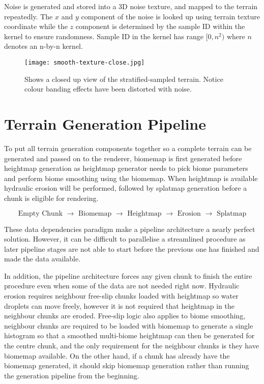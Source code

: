 \documentclass[oneside, a4paper]{report}
\begin{document}
    Noise is generated and stored into a 3D noise texture, and mapped to the terrain repeatedly. The $x$ and $y$ component of the noise is looked up using terrain texture coordinate while the $z$ component is determined by the sample ID within the kernel to ensure randomness. Sample ID in the kernel has range \([0, n^{2})\) where $n$ denotes an n-by-n kernel.

    \begin{figure}[H]
        \center
        \texttt{[image: smooth-texture-close.jpg]}
        \caption{Shows a closed up view of the stratified-sampled terrain. Notice colour banding effects have been distorted with noise.}
    \end{figure}

    \section{Terrain Generation Pipeline}

    To put all terrain generation components together so a complete terrain can be generated and passed on to the renderer, biomemap is first generated before heightmap generation as heightmap generator needs to pick biome parameters and perform biome smoothing using the biomemap. When heightmap is available hydraulic erosion will be performed, followed by splatmap generation before a chunk is eligible for rendering.

    \begin{equation*}
        \text{Empty Chunk } \rightarrow \text{ Biomemap } \rightarrow \text{ Heightmap } \rightarrow \text{ Erosion } \rightarrow \text{ Splatmap}
    \end{equation*}

    These data dependencies paradigm make a pipeline architecture a nearly perfect solution. However, it can be difficult to parallelise a streamlined procedure as later pipeline stages are not able to start before the previous one has finished and made the data available.
    
    In addition, the pipeline architecture forces any given chunk to finish the entire procedure even when some of the data are not needed right now. Hydraulic erosion requires neighbour free-slip chunks loaded with heightmap so water droplets can move freely, however it is not required that heightmap in the neighbour chunks are eroded. Free-slip logic also applies to biome smoothing, neighbour chunks are required to be loaded with biomemap to generate a single histogram so that a smoothed multi-biome heightmap can then be generated for the centre chunk, and the only requirement for the neighbour chunks is they have biomemap available. On the other hand, if a chunk has already have the biomemap generated, it should skip biomemap generation rather than running the generation pipeline from the beginning.
\end{document}
